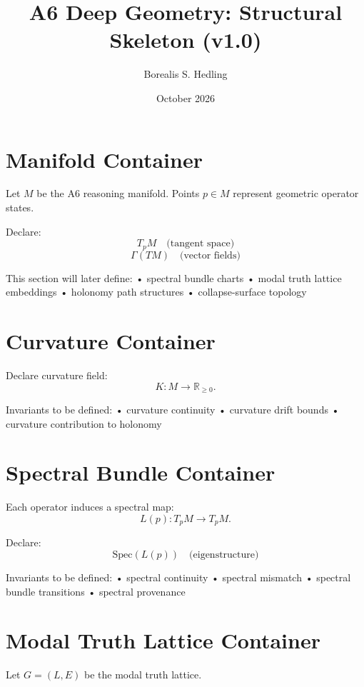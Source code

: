 \documentclass[11pt]{article}
\title{A6 Deep Geometry: Structural Skeleton (v1.0)}
\author{Borealis S. Hedling}
\date{October 2026}
\begin{document}
\maketitle

\section{Manifold Container}

Let $M$ be the A6 reasoning manifold.
Points $p \in M$ represent geometric operator states.

Declare:
\[
T_pM \quad\text{(tangent space)}
\]
\[
\Gamma(TM) \quad\text{(vector fields)}
\]

This section will later define:
  • spectral bundle charts  
  • modal truth lattice embeddings  
  • holonomy path structures  
  • collapse-surface topology  

\section{Curvature Container}

Declare curvature field:
\[
K : M \to \mathbb{R}_{\ge 0}.
\]

Invariants to be defined:
  • curvature continuity  
  • curvature drift bounds  
  • curvature contribution to holonomy  

\section{Spectral Bundle Container}

Each operator induces a spectral map:
\[
L(p) : T_pM \to T_pM.
\]

Declare:
\[
\mathrm{Spec}(L(p)) \quad\text{(eigenstructure)}
\]

Invariants to be defined:
  • spectral continuity  
  • spectral mismatch  
  • spectral bundle transitions  
  • spectral provenance  

\section{Modal Truth Lattice Container}

Let $G = (L, E)$ be the modal truth lattice.
\end{document}
